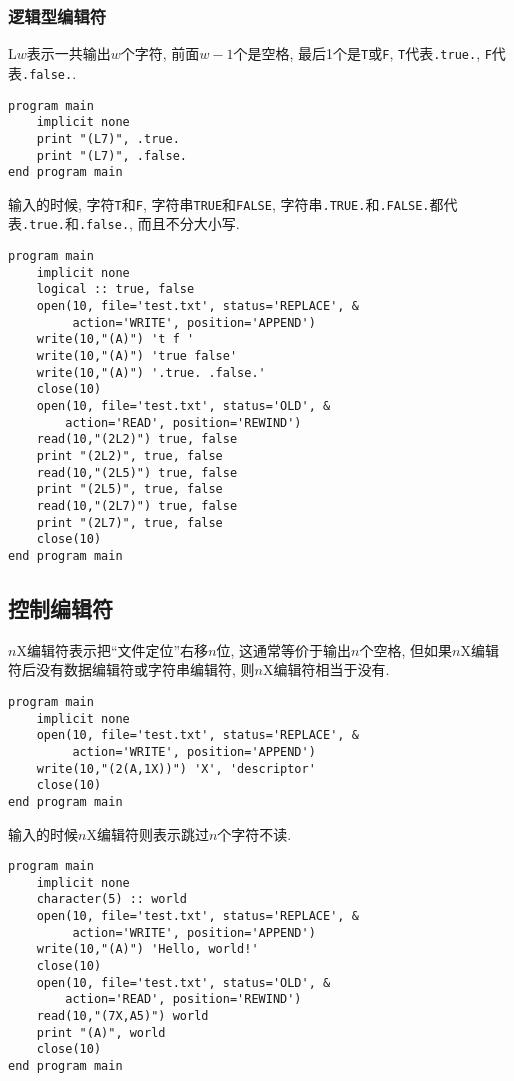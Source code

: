 \subsubsection{逻辑型编辑符}

L$w$表示一共输出$w$个字符, 前面$w-1$个是空格, 最后1个是\verb|T|或\verb|F|, \verb|T|代表\verb|.true.|, \verb|F|代表\verb|.false.|.
\begin{verbatim}
program main
    implicit none
    print "(L7)", .true.
    print "(L7)", .false.
end program main
\end{verbatim}
输入的时候, 字符\verb|T|和\verb|F|, 字符串\verb|TRUE|和\verb|FALSE|, 字符串\verb|.TRUE.|和\verb|.FALSE.|都代表\verb|.true.|和\verb|.false.|, 而且不分大小写.
\begin{verbatim}
program main
    implicit none
    logical :: true, false
    open(10, file='test.txt', status='REPLACE', &
         action='WRITE', position='APPEND')
    write(10,"(A)") 't f '
    write(10,"(A)") 'true false'
    write(10,"(A)") '.true. .false.'
    close(10)
    open(10, file='test.txt', status='OLD', &
        action='READ', position='REWIND')
    read(10,"(2L2)") true, false
    print "(2L2)", true, false
    read(10,"(2L5)") true, false
    print "(2L5)", true, false
    read(10,"(2L7)") true, false
    print "(2L7)", true, false
    close(10)
end program main
\end{verbatim}

\subsection{控制编辑符}

$n$X编辑符表示把``文件定位''右移$n$位, 这通常等价于输出$n$个空格, 但如果$n$X编辑符后没有数据编辑符或字符串编辑符, 则$n$X编辑符相当于没有.
\begin{verbatim}
program main
    implicit none
    open(10, file='test.txt', status='REPLACE', &
         action='WRITE', position='APPEND')
    write(10,"(2(A,1X))") 'X', 'descriptor'
    close(10)
end program main
\end{verbatim}
输入的时候$n$X编辑符则表示跳过$n$个字符不读.
\begin{verbatim}
program main
    implicit none
    character(5) :: world
    open(10, file='test.txt', status='REPLACE', &
         action='WRITE', position='APPEND')
    write(10,"(A)") 'Hello, world!'
    close(10)
    open(10, file='test.txt', status='OLD', &
        action='READ', position='REWIND')
    read(10,"(7X,A5)") world
    print "(A)", world
    close(10)
end program main
\end{verbatim}

